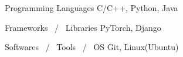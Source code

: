 

\begin{cvskills}

  \cvskill
    {Programming Languages} %
    {C/C++, Python, Java} %


  \cvskill
    {Frameworks \, / \, Libraries} %
    {PyTorch, Django} %

\cvskill
    {Softwares \, / \, Tools \, / \, OS} %
    {Git, Linux(Ubuntu)} %

\end{cvskills}

